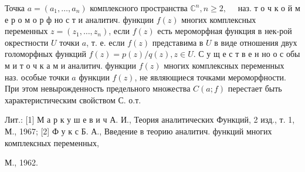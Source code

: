 \documentclass[10pt]{article}
\begin{document}
Точка $a=\left(a_{1}, \ldots, a_{n}\right)$ комплексного пространства $\mathbb{C}^{n}, n \geqslant 2, \quad$ наз. т о ч к о й м е р о м о р ф но с т и аналитич. функции $f(z)$ многих комплексных переменных $z=\left(z_{1}, \ldots, z_{n}\right)$, если $f(z)$ есть мероморфная функция в нек-рой окрестности $U$ точки $a$, т. е. если $f(z)$ представима в $U$ в виде отношения двух голоморфных функций $f(z)=p(z) / q(z), z \in U$. С у щ е с т в е н но о с обы м и т о ч к а м и аналитич. функции $f(z)$ многих комплексных переменных наз. особые точки $a$ функции $f(z)$, не являющиеся точками мероморфности. При этом невырожденность предельного множества $C(a ; f)$ перестает быть характеристическим свойством С. о.т.



Лит.: [1] М а р к у ш е в и ч А. И., Теория аналитических Функций, 2 изд., т. 1, М., 1967; [2] Ф у к с Б. А., Введение в теорию аналитич. функций многих комплексных переменных,

М., 1962.
\end{document}
